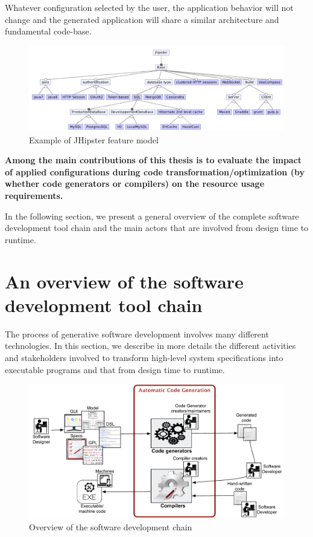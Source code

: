 Whatever configuration selected by the user, the application behavior will not change and the generated application will share a similar architecture and fundamental code-base.
\begin{figure}[h]
	\center
	\includegraphics[scale=0.65]{Background/fig/jhipster}
	\caption{Example of JHipster feature model}
	\label{fig:jhipster}
\end{figure}



\textbf{Among the main contributions of this thesis is to evaluate the impact of applied configurations during code transformation/optimization (by whether code generators or compilers) on the resource usage requirements. 
}

In the following section, we present a general overview of the complete software development tool chain and the main actors that are involved from design time to runtime.


\section{An overview of the software development tool chain}
The process of generative software development involves many different technologies. In this section, we describe in more details the different activities and stakeholders involved to transform high-level system specifications into executable programs and that from design time to runtime.
\begin{figure}[h]
	\center
	\includegraphics[scale=0.65]{Background/fig/background_overview2.pdf}
	\caption{Overview of the software development chain}
	\label{fig:background_overview2}
\end{figure}
